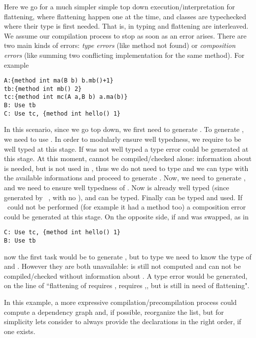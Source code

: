 Here we go for a much simpler simple top down execution/interpretation for flattening, where flattening
happen one at the time, and classes are typechecked where their type is first needed.
That is, in \name typing and flattening are interleaved. We assume our compilation process to stop as soon as 
an error arises. There are two main kinds of errors: \emph{type errors} (like method not found) or \emph{composition errors} (like summing two conflicting implementation for the same method).
For example
\saveSpace\begin{lstlisting}
A:{method int ma(B b) b.mb()+1}
tb:{method int mb() 2}
tc:{method int mc(A a,B b) a.ma(b)}
B: Use tb
C: Use tc, {method int hello() 1}
\end{lstlisting}\saveSpace
In this scenario, since we go top down, we first need to generate \Q@B@.
To generate \Q@B@, we need to use \Q@tb@.
In order to modularly ensure well typedness,
we require \Q@tb@ to be well typed at this stage. If \Q@tb@ was not well typed
a type error could be generated at this stage.
At this moment, \Q@A@ cannot be compiled/checked alone:
information about \Q@B@ is needed, but \Q@A@ is not used in \Q@tb@,
thus we do not need to type \Q@A@ and we can type \Q@tb@ with
 the available informations and proceed to generate \Q@B@.
Now, we need to generate \Q@C@, and we need to ensure well typedness of \Q@tc@.
Now \Q@B@ is already well typed (since generated by \use\ \Q@tb@, with no \mL),
and \Q@A@ can be typed. Finally \Q@tc@ can be typed and used.
If \use\ could not be performed (for example it \Q@tc@ had a method \Q@hello@ too)
a composition error could be generated at this stage.
On the opposite side, if \Q@B@ and \Q@C@ was swapped, as in
\saveSpace\begin{lstlisting}
C: Use tc, {method int hello() 1}  
B: Use tb
\end{lstlisting}\saveSpace
\noindent
now the first task would be to generate \Q@C@, but 
to type \Q@tc@ we need to know the type of \Q@A@ and \Q@B@.
However they are both unavailable: \Q@B@ is still not computed and 
\Q@A@ can not be compiled/checked without information about \Q@B@.
A type error would be generated, on the line of ``flattening of \Q@C@
requires \Q@tc@, \Q@tc@ requires \Q@A@,\Q@B@, but \Q@B@ is still in need of flattening".

In this example, a more expressive compilation/precompilation process 
could compute a dependency graph and, if possible, reorganize the list,
but for simplicity lets consider to always provide the declarations
in the right order, if one exists.

